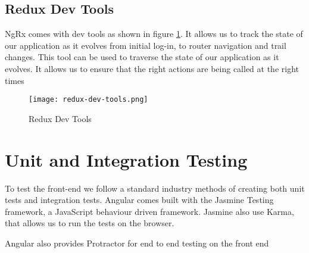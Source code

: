 \subsection{Redux Dev Tools}
NgRx comes with dev tools as shown in figure \ref{fig:reduxDevTools}. It allows us to track the state of our application as it evolves from initial log-in, to router navigation and trail changes. This tool can be used to traverse the state of our application as it evolves. It allows us to ensure that the right actions are being called at the right times
\begin{figure}[ht]
    \centering
    \texttt{[image: redux-dev-tools.png]}
    \caption{Redux Dev Tools}
    \label{fig:reduxDevTools}
\end{figure}


\section{Unit and Integration Testing}
To test the front-end we follow a standard industry methods of creating both unit tests and integration tests. Angular comes built with the Jasmine Testing framework, a JavaScript behaviour driven framework. Jasmine also use Karma, that allows us to run the tests on the browser.

Angular also provides Protractor for end to end testing on the front end